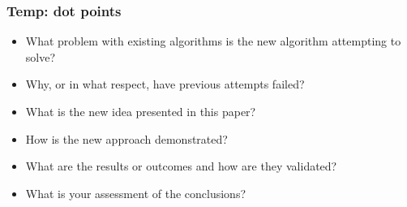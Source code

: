 \subsubsection{Temp: dot points}
\begin{itemize}
    \item What problem with existing algorithms is the new algorithm attempting to solve?
    \item Why, or in what respect, have previous attempts failed?
    \item What is the new idea presented in this paper?
    \item How is the new approach demonstrated?
    \item What are the results or outcomes and how are they validated?
    \item What is your assessment of the conclusions?
\end{itemize}
